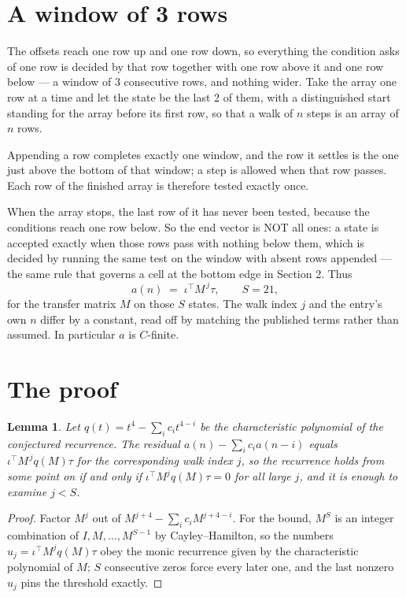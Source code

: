 \documentclass[11pt,a4paper]{article}
\theoremstyle{plain}
\newtheorem{lemma}[theorem]{Lemma}
\theoremstyle{definition}
\begin{document}
\section{A window of 3 rows}

The offsets reach one row up and one row down, so everything the condition asks of one row is
decided by that row together with one row above it and one row below --- a window of
$3$ consecutive rows, and nothing wider. Take the array one row at a time and
let the state be the last 2 of them, with a distinguished start standing for the array before its
first row, so that a walk of $n$ steps is an array of $n$ rows.

Appending a row completes exactly one window, and the row it settles is the one just above the bottom of that window; a step is
allowed when that row passes. Each row of the finished array is therefore tested exactly once.

When the array stops, the last row of it has never been tested, because the
conditions reach one row below. So the end vector is NOT all ones: a state is accepted exactly when
those rows pass with nothing below them, which is decided by running the same test on the window
with absent rows appended --- the same rule that governs a cell at the bottom edge in
Section 2.
Thus
\[
a(n)\;=\;\iota^{\!\top}M^{\,j}\tau ,\qquad S=21,
\]
for the transfer matrix $M$ on those $S$ states. The walk index $j$ and the entry's own $n$
differ by a constant, read off by matching the published terms rather than assumed. In
particular $a$ is $C$-finite.

\section{The proof}

\begin{lemma}\label{lem:crit}
Let $q(t)=t^{4}-\sum_i c_it^{4-i}$ be the characteristic polynomial of the
conjectured recurrence. The residual $a(n)-\sum_ic_ia(n-i)$ equals
$\iota^{\!\top}M^{\,j}q(M)\tau$ for the corresponding walk index $j$, so the recurrence
holds from some point on if and only if $\iota^{\!\top}M^{j}q(M)\tau=0$ for all large $j$,
and it is enough to examine $j<S$.
\end{lemma}

\begin{proof}
Factor $M^{j}$ out of $M^{j+4}-\sum_ic_iM^{j+4-i}$. For the bound, $M^{S}$
is an integer combination of $I,M,\dots,M^{S-1}$ by Cayley--Hamilton, so the numbers
$u_j=\iota^{\!\top}M^{j}q(M)\tau$ obey the monic recurrence given by the characteristic
polynomial of $M$; $S$ consecutive zeros force every later one, and the last nonzero $u_j$
pins the threshold exactly.
\end{proof}
\end{document}
